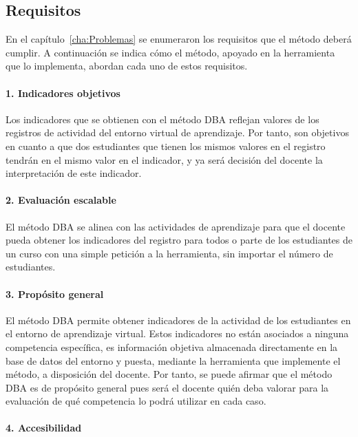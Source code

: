 \subsection{Requisitos}

En el capítulo~\ref{cha:Problemas} se enumeraron los requisitos que el método deberá cumplir. A continuación se indica cómo el método, apoyado en la herramienta que lo implementa, abordan cada uno de estos requisitos.

\paragraph*{1. Indicadores objetivos}

Los indicadores que se obtienen con el método DBA reflejan valores de los registros de actividad del entorno virtual de aprendizaje. Por tanto, son objetivos en cuanto a que dos estudiantes que tienen los mismos valores en el registro tendrán en el mismo valor en el indicador, y ya será decisión del docente la interpretación de este indicador.

\paragraph*{2. Evaluación escalable}

El método DBA se alinea con las actividades de aprendizaje para que el docente pueda obtener los indicadores del registro para todos o parte de los estudiantes de un curso con una simple petición a la herramienta, sin importar el número de estudiantes.

\paragraph*{3. Propósito general}

El método DBA permite obtener indicadores de la actividad de los estudiantes en el entorno de aprendizaje virtual. Estos indicadores no están asociados a ninguna competencia específica, es información objetiva almacenada directamente en la base de datos del entorno y puesta, mediante la herramienta que implemente el método, a disposición del docente. Por tanto, se puede afirmar que el método DBA es de propósito general pues será el docente quién deba valorar para la evaluación de qué competencia lo podrá utilizar en cada caso.

\paragraph*{4. Accesibilidad}

